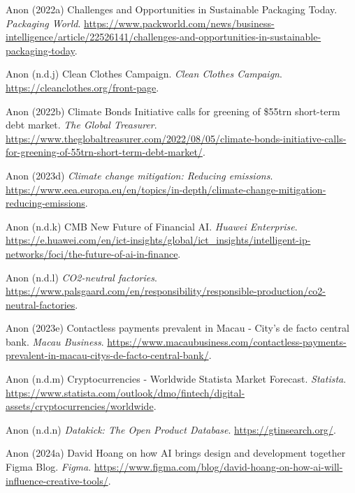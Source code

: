 \documentclass[
  letterpaper,
  DIV=11,
  numbers=noendperiod]{scrartcl}
\newlength{\cslhangindent}
\newenvironment{CSLReferences}[2] %
 {\begin{list}{}{%
  \setlength{\itemindent}{0pt}
  \setlength{\leftmargin}{0pt}
  \setlength{\parsep}{0pt}
  \ifodd #1
   \setlength{\leftmargin}{\cslhangindent}
   \setlength{\itemindent}{-1\cslhangindent}
  \fi
  \setlength{\itemsep}{#2\baselineskip}}}
 {\end{list}}
\begin{document}
\begin{CSLReferences}{0}{1}
Anon (2022a) Challenges and {Opportunities} in {Sustainable Packaging
Today}. \emph{Packaging World}.
\url{https://www.packworld.com/news/business-intelligence/article/22526141/challenges-and-opportunities-in-sustainable-packaging-today}.

Anon (n.d.j) Clean {Clothes Campaign}. \emph{Clean Clothes Campaign}.
\url{https://cleanclothes.org/front-page}.

Anon (2022b) Climate {Bonds Initiative} calls for greening of \$55trn
short-term debt market. \emph{The Global Treasurer}.
\url{https://www.theglobaltreasurer.com/2022/08/05/climate-bonds-initiative-calls-for-greening-of-55trn-short-term-debt-market/}.

Anon (2023d) \emph{Climate change mitigation: Reducing emissions}.
\url{https://www.eea.europa.eu/en/topics/in-depth/climate-change-mitigation-reducing-emissions}.

Anon (n.d.k) {CMB} {\textbar} {New Future} of {Financial AI}.
\emph{Huawei Enterprise}.
\url{https://e.huawei.com/en/ict-insights/global/ict_insights/intelligent-ip-networks/foci/the-future-of-ai-in-finance}.

Anon (n.d.l) \emph{{CO2-neutral} factories}.
\url{https://www.palsgaard.com/en/responsibility/responsible-production/co2-neutral-factories}.

Anon (2023e) Contactless payments prevalent in {Macau} - {City}'s de
facto central bank. \emph{Macau Business}.
\url{https://www.macaubusiness.com/contactless-payments-prevalent-in-macau-citys-de-facto-central-bank/}.

Anon (n.d.m) Cryptocurrencies - {Worldwide} {\textbar} {Statista Market
Forecast}. \emph{Statista}.
\url{https://www.statista.com/outlook/dmo/fintech/digital-assets/cryptocurrencies/worldwide}.

Anon (n.d.n) \emph{Datakick: {The Open Product Database}}.
\url{https://gtinsearch.org/}.

Anon (2024a) David {Hoang} on how {AI} brings design and development
together {\textbar} {Figma Blog}. \emph{Figma}.
\url{https://www.figma.com/blog/david-hoang-on-how-ai-will-influence-creative-tools/}.


\end{CSLReferences}
\end{document}
